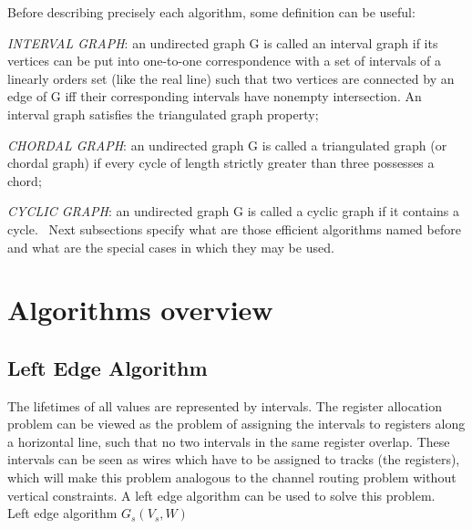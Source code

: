  Before describing precisely each algorithm, some definition can be useful\+:
\begin{DoxyItemize}
\item {\itshape I\+N\+T\+E\+R\+V\+AL G\+R\+A\+PH}\+: an undirected graph G is called an interval graph if its vertices can be put into one-\/to-\/one correspondence with a set of intervals of a linearly orders set (like the real line) such that two vertices are connected by an edge of G iff their corresponding intervals have nonempty intersection. An interval graph satisfies the triangulated graph property;
\item {\itshape C\+H\+O\+R\+D\+AL G\+R\+A\+PH}\+: an undirected graph G is called a triangulated graph (or chordal graph) if every cycle of length strictly greater than three possesses a chord;
\item {\itshape C\+Y\+C\+L\+IC G\+R\+A\+PH}\+: an undirected graph G is called a cyclic graph if it contains a cycle.~\newline
 Next subsections specify what are those efficient algorithms named before and what are the special cases in which they may be used.
\end{DoxyItemize}\hypertarget{src_HLS_registerAllocation_page_algorithms}{}\section{Algorithms overview}\label{src_HLS_registerAllocation_page_algorithms}
\hypertarget{src_HLS_registerAllocation_page_lea}{}\subsection{Left Edge Algorithm}\label{src_HLS_registerAllocation_page_lea}
The lifetimes of all values are represented by intervals. The register allocation problem can be viewed as the problem of assigning the intervals to registers along a horizontal line, such that no two intervals in the same register overlap. These intervals can be seen as wires which have to be assigned to tracks (the registers), which will make this problem analogous to the channel routing problem without vertical constraints. A left edge algorithm can be used to solve this problem.~\newline
 ~\newline
 Left edge algorithm $G_s (V_s , W)$ ~\newline
~\newline
